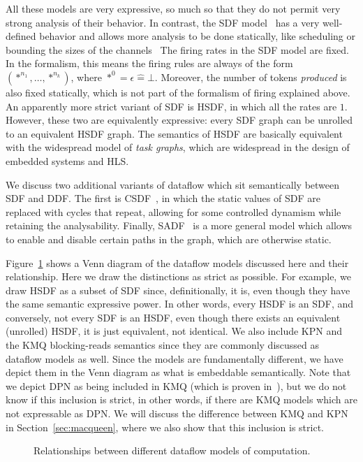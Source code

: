 All these models are very expressive, so much so that they do not permit very strong analysis of their behavior.
In contrast, the \ac{SDF} model~\cite{lee1987sdf} has a very well-defined behavior and allows more analysis to be done statically, like scheduling or bounding the sizes of the channels~\cite{Parks:M95:105}
The firing rates in the \ac{SDF} model are fixed. In the formalism, this means the firing rules are always of the form $(*^{n_1},\ldots,*^{n_k})$, where $*^0 = \epsilon \mathrel{\widehat{=}} \bot$.
Moreover, the number of tokens \emph{produced} is also fixed statically, which is not part of the formalism of firing explained above. 
An apparently more strict variant of \ac{SDF} is \ac{HSDF}, in which all the rates are $1$. However, these two are equivalently expressive: every \ac{SDF} graph can be unrolled to an equivalent \ac{HSDF} graph.
The semantics of \ac{HSDF} are basically equivalent with the widespread model of \emph{task graphs}, which are widespread in the design of embedded systems and \ac{HLS}.


We discuss two additional variants of dataflow which sit semantically between \ac{SDF} and \ac{DDF}. 
The first is \ac{CSDF}~\cite{bilsen1996cycle}, in which the static values of \ac{SDF} are replaced with cycles that repeat, allowing for some controlled dynamism while retaining the analysability.
Finally, \ac{SADF}~\cite{theelen2006scenario} is a more general model which allows to enable and disable certain paths in the graph, which are otherwise static.

Figure~\ref{fig:dataflow_mocs} shows a Venn diagram of the dataflow models discussed here and their relationship.
Here we draw the distinctions as strict as possible.
For example, we draw \ac{HSDF} as a subset of \ac{SDF} since, definitionally, it is, even though they have the same semantic expressive power.
In other words, every \ac{HSDF} is an \ac{SDF}, and conversely, not every \ac{SDF} is an \ac{HSDF}, even though there exists an equivalent (unrolled) \ac{HSDF}, it is just equivalent, not identical.
We also include \ac{KPN} and the \ac{KMQ} blocking-reads semantics since they are commonly discussed as dataflow models as well.
Since the models are fundamentally different, we have depict them in the Venn diagram as what is embeddable semantically.
Note that we depict \ac{DPN} as being included in \ac{KMQ} (which is proven in~\cite{lee_matsikoudis_semantics}), but we do not know if this inclusion is strict, in other words, if there are \ac{KMQ} models which are not expressable as \ac{DPN}.
We will discuss the difference between \ac{KMQ} and \ac{KPN} in Section~\ref{sec:macqueen}, where we also show that this inclusion is strict.

\begin{figure}[h]
	\centering
   \resizebox{0.65\textwidth}{!}{}
	\caption{Relationships between different dataflow models of computation.}
	\label{fig:dataflow_mocs}
\end{figure}